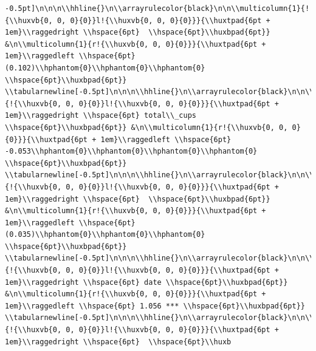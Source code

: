 \documentclass[11pt,preprint, authoryear]{elsarticle}
\numberwithin{equation}{section}
\numberwithin{figure}{section}
\numberwithin{table}{section}
\begin{document}
\begin{verbatim}
-0.5pt]\n\n\n\\hhline{}\n\\arrayrulecolor{black}\n\n\\multicolumn{1}{!{\\huxvb{0, 0, 0}{0}}l!{\\huxvb{0, 0, 0}{0}}}{\\huxtpad{6pt + 1em}\\raggedright \\hspace{6pt}  \\hspace{6pt}\\huxbpad{6pt}} &\n\\multicolumn{1}{r!{\\huxvb{0, 0, 0}{0}}}{\\huxtpad{6pt + 1em}\\raggedleft \\hspace{6pt} (0.102)\\hphantom{0}\\hphantom{0}\\hphantom{0} \\hspace{6pt}\\huxbpad{6pt}} \\tabularnewline[-0.5pt]\n\n\n\\hhline{}\n\\arrayrulecolor{black}\n\n\\multicolumn{1}{!{\\huxvb{0, 0, 0}{0}}l!{\\huxvb{0, 0, 0}{0}}}{\\huxtpad{6pt + 1em}\\raggedright \\hspace{6pt} total\\_cups \\hspace{6pt}\\huxbpad{6pt}} &\n\\multicolumn{1}{r!{\\huxvb{0, 0, 0}{0}}}{\\huxtpad{6pt + 1em}\\raggedleft \\hspace{6pt} -0.053\\hphantom{0}\\hphantom{0}\\hphantom{0}\\hphantom{0} \\hspace{6pt}\\huxbpad{6pt}} \\tabularnewline[-0.5pt]\n\n\n\\hhline{}\n\\arrayrulecolor{black}\n\n\\multicolumn{1}{!{\\huxvb{0, 0, 0}{0}}l!{\\huxvb{0, 0, 0}{0}}}{\\huxtpad{6pt + 1em}\\raggedright \\hspace{6pt}  \\hspace{6pt}\\huxbpad{6pt}} &\n\\multicolumn{1}{r!{\\huxvb{0, 0, 0}{0}}}{\\huxtpad{6pt + 1em}\\raggedleft \\hspace{6pt} (0.035)\\hphantom{0}\\hphantom{0}\\hphantom{0} \\hspace{6pt}\\huxbpad{6pt}} \\tabularnewline[-0.5pt]\n\n\n\\hhline{}\n\\arrayrulecolor{black}\n\n\\multicolumn{1}{!{\\huxvb{0, 0, 0}{0}}l!{\\huxvb{0, 0, 0}{0}}}{\\huxtpad{6pt + 1em}\\raggedright \\hspace{6pt} date \\hspace{6pt}\\huxbpad{6pt}} &\n\\multicolumn{1}{r!{\\huxvb{0, 0, 0}{0}}}{\\huxtpad{6pt + 1em}\\raggedleft \\hspace{6pt} 1.056 *** \\hspace{6pt}\\huxbpad{6pt}} \\tabularnewline[-0.5pt]\n\n\n\\hhline{}\n\\arrayrulecolor{black}\n\n\\multicolumn{1}{!{\\huxvb{0, 0, 0}{0}}l!{\\huxvb{0, 0, 0}{0}}}{\\huxtpad{6pt + 1em}\\raggedright \\hspace{6pt}  \\hspace{6pt}\\huxb
\end{verbatim}
\end{document}

